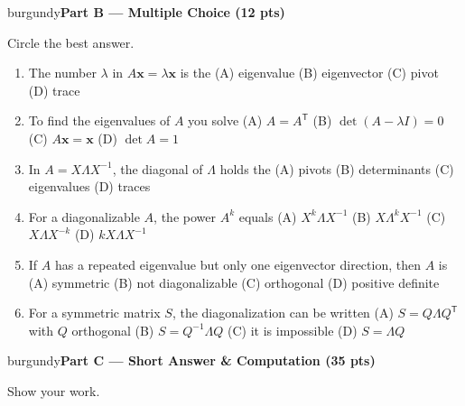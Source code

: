 \documentclass[10pt]{article}
\newcommand{\xx}{\mathbf{x}}
\newcommand{\T}{^{\mathsf T}}
\newcommand{\parthead}[1]{%
  \vspace{6pt}\noindent
  \begin{headlinebox}{burgundy}{\color{white}\bfseries #1}\end{headlinebox}%
  \vspace{4pt}}
\begin{document}
\parthead{Part B --- Multiple Choice (12 pts)}
Circle the best answer.

\begin{enumerate}[leftmargin=1.9em, itemsep=9pt]
  \item The number $\lambda$ in $A\xx=\lambda\xx$ is the
    \hfill (A) eigenvalue \quad (B) eigenvector \quad (C) pivot \quad (D) trace
  \item To find the eigenvalues of $A$ you solve
    \hfill (A) $A=A\T$ \quad (B) $\det(A-\lambda I)=0$ \quad (C) $A\xx=\xx$ \quad (D) $\det A=1$
  \item In $A=X\Lambda X^{-1}$, the diagonal of $\Lambda$ holds the
    \hfill (A) pivots \quad (B) determinants \quad (C) eigenvalues \quad (D) traces
  \item For a diagonalizable $A$, the power $A^k$ equals
    \hfill (A) $X^k\Lambda X^{-1}$ \quad (B) $X\Lambda^k X^{-1}$ \quad (C) $X\Lambda X^{-k}$ \quad (D) $kX\Lambda X^{-1}$
  \item If $A$ has a repeated eigenvalue but only one eigenvector direction, then $A$ is
    \hfill (A) symmetric \quad (B) not diagonalizable \quad (C) orthogonal \quad (D) positive definite
  \item For a symmetric matrix $S$, the diagonalization can be written
    \hfill (A) $S=Q\Lambda Q\T$ with $Q$ orthogonal \quad (B) $S=Q^{-1}\Lambda Q$ \quad (C) it is impossible \quad (D) $S=\Lambda Q$
\end{enumerate}

\parthead{Part C --- Short Answer \& Computation (35 pts)}
Show your work.
\end{document}
